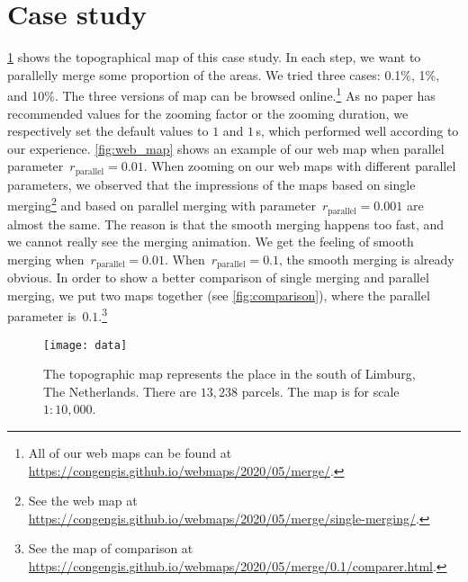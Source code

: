 \documentclass{ica}
\begin{document}
\section{Case study}
\label{sec:case_study}





%
\fig\ref{fig:data} shows the topographical map of this case study.
In each step, we want to parallelly merge some proportion of the areas.
We tried three cases: 0.1\%, 1\%, and 10\%.
The three versions of map can be browsed online.\footnote{%
All of our web maps can be found at
\url{https://congengis.github.io/webmaps/2020/05/merge/}.}
As no paper has recommended values for 
the zooming factor or the zooming duration,
we respectively set the default values to $1$ and $1\,$s, 
which performed well according to our experience.
\fig\ref{fig:web_map} shows an example of our web map when 
parallel parameter~$r_\mathrm{parallel}=0.01$.
When zooming on our web maps with different parallel parameters,
we observed that the impressions of the maps 
based on single merging\footnote{%
See the web map at
\url{https://congengis.github.io/webmaps/2020/05/merge/single-merging/}.} 
and based on parallel merging with parameter~$r_\mathrm{parallel}= 0.001$ 
are almost the same.
The reason is that the smooth merging happens too fast,
and we cannot really see the merging animation.
We get the feeling of smooth merging when~$r_\mathrm{parallel}= 0.01$.
When~$r_\mathrm{parallel}= 0.1$, the smooth merging is already obvious.
In order to show a better comparison of single merging 
and parallel merging,
we put two maps together (see \fig\ref{fig:comparison}),
where the parallel parameter is~$0.1$.\footnote{%
See the map of comparison at
\url{https://congengis.github.io/webmaps/2020/05/merge/0.1/comparer.html}.}  




\begin{figure}[tb]
\centering
\texttt{[image: data]}
\caption{
    The topographic map represents the place 
    in the south of Limburg, The Netherlands.
    There are $13{,}238$ parcels.
    The map is for scale $1:10{,}000$.}
\label{fig:data}
\end{figure}
\end{document}
